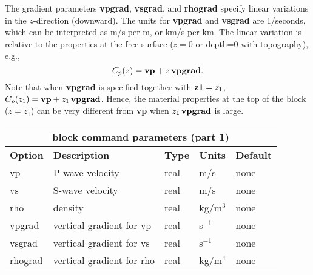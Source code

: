 \documentclass[11pt]{report}
\begin{document}
The gradient parameters {\bf vpgrad}, {\bf vsgrad}, and {\bf rhograd} specify linear variations in the
$z$-direction (downward). The units for {\bf vpgrad} and {\bf vsgrad} are 1/seconds, which
can be interpreted as m/s per m, or km/s per km. The linear variation is relative to the properties at
the free surface ($z=0$ or depth=0 with topography), e.g.,
\[
C_p(z) = {\bf vp} + z \, {\bf vpgrad}.
\]
Note that when {\bf vpgrad} is specified together with ${\bf z1}=z_1$, $C_p(z_1) = {\bf vp} + z_1\,
{\bf vpgrad}$. Hence, the material properties at the top of the block ($z=z_1$) can be very
different from {\bf vp} when $z_1\, {\bf vpgrad}$ is large.
\begin{center}
\begin{tabular}{|l|p{8cm}|l|l|l|} \hline
\multicolumn{5}{|c|}{\bf block command parameters (part 1)}\\ \hline
{\bf Option} & {\bf Description}          & {\bf Type} & {\bf Units} & {\bf Default} \\ \hline 
\hline
vp          & P-wave velocity           & real     & m/s      & none \\ \hline
vs          & S-wave velocity           & real     & m/s      & none \\ \hline
rho         & density                   & real     & kg/m$^3$ & none \\ \hline
vpgrad      & vertical gradient for vp  & real     & s$^{-1}$  & none \\ \hline
vsgrad      & vertical gradient for vs  & real     & s$^{-1}$  & none \\ \hline
rhograd     & vertical gradient for rho & real     & kg/m$^4$  & none \\ \hline
\end{tabular}
\end{center}
%
\end{document}
